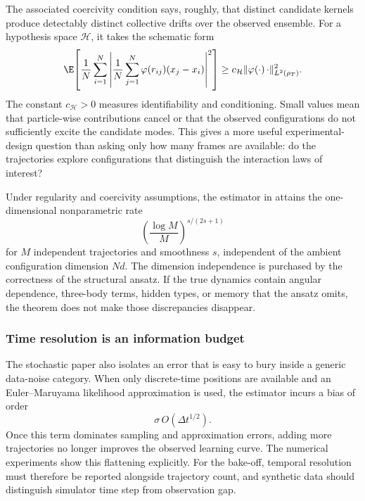 The associated coercivity condition says, roughly, that distinct candidate kernels produce detectably distinct collective drifts over the observed ensemble. For a hypothesis space \(\mathcal H\), it takes the schematic form
\begin{equation}
\E\!\left[
\frac{1}{N}\sum_{i=1}^{N}
\left|
\frac{1}{N}\sum_{j=1}^{N}
\varphi(r_{ij})(x_j-x_i)
\right|^2
\right]
\ge
c_{\mathcal H}
\lVert \varphi(\cdot)\,\cdot\rVert_{L^2(\rho_T)}^2 .
\label{eq:coercivity-many-body}
\end{equation}
The constant \(c_{\mathcal H}>0\) measures identifiability and conditioning. Small values mean that particle-wise contributions cancel or that the observed configurations do not sufficiently excite the candidate modes. This gives a more useful experimental-design question than asking only how many frames are available: do the trajectories explore configurations that distinguish the interaction laws of interest?

Under regularity and coercivity assumptions, the estimator in \citet{lu2022stochasticinteractions} attains the one-dimensional nonparametric rate
\begin{equation}
\left(\frac{\log M}{M}\right)^{s/(2s+1)}
\end{equation}
for \(M\) independent trajectories and smoothness \(s\), independent of the ambient configuration dimension \(Nd\). The dimension independence is purchased by the correctness of the structural ansatz. If the true dynamics contain angular dependence, three-body terms, hidden types, or memory that the ansatz omits, the theorem does not make those discrepancies disappear.

\subsubsection{Time resolution is an information budget}

The stochastic paper also isolates an error that is easy to bury inside a generic data-noise category. When only discrete-time positions are available and an Euler--Maruyama likelihood approximation is used, the estimator incurs a bias of order
\begin{equation}
\sigma\,O(\Delta t^{1/2}).
\end{equation}
Once this term dominates sampling and approximation errors, adding more trajectories no longer improves the observed learning curve. The numerical experiments show this flattening explicitly. For the bake-off, temporal resolution must therefore be reported alongside trajectory count, and synthetic data should distinguish simulator time step from observation gap.

